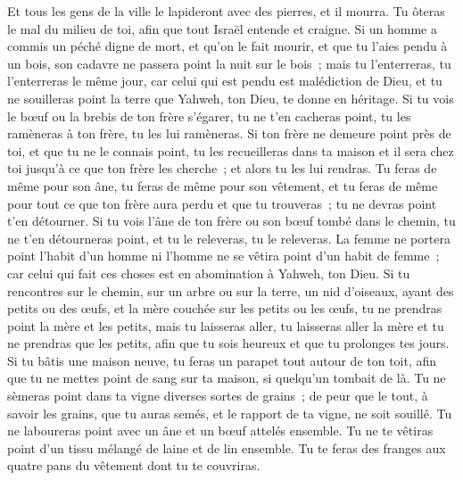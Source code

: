 \begin{multicols}{2}
Et tous les gens de la ville le lapideront avec des pierres, et il mourra. Tu ôteras le mal du milieu de toi, afin que tout Israël entende et craigne.
Si un homme a commis un péché digne de mort, et qu'on le fait mourir, et que tu l'aies pendu à un bois,
son cadavre ne passera point la nuit sur le bois~; mais tu l'enterreras, tu l'enterreras le même jour, car celui qui est pendu est malédiction de Dieu, et tu ne souilleras point la terre que Yahweh, ton Dieu, te donne en héritage.
\VerseOne{}Si tu vois le bœuf ou la brebis de ton frère s'égarer, tu ne t'en cacheras point, tu les ramèneras à ton frère, tu les lui ramèneras.
Si ton frère ne demeure point près de toi, et que tu ne le connais point, tu les recueilleras dans ta maison et il sera chez toi jusqu'à ce que ton frère les cherche~; et alors tu les lui rendras.
Tu feras de même pour son âne, tu feras de même pour son vêtement, et tu feras de même pour tout ce que ton frère aura perdu et que tu trouveras~; tu ne devras point t'en détourner.
Si tu vois l'âne de ton frère ou son bœuf tombé dans le chemin, tu ne t'en détourneras point, et tu le releveras, tu le releveras.
La femme ne portera point l'habit d'un homme ni l'homme ne se vêtira point d'un habit de femme~; car celui qui fait ces choses est en abomination à Yahweh, ton Dieu.
Si tu rencontres sur le chemin, sur un arbre ou sur la terre, un nid d'oiseaux, ayant des petits ou des œufs, et la mère couchée sur les petits ou les œufs, tu ne prendras point la mère et les petits,
mais tu laisseras aller, tu laisseras aller la mère et tu ne prendras que les petits, afin que tu sois heureux et que tu prolonges tes jours.
Si tu bâtis une maison neuve, tu feras un parapet tout autour de ton toit, afin que tu ne mettes point de sang sur ta maison, si quelqu'un tombait de là.
Tu ne sèmeras point dans ta vigne diverses sortes de grains~; de peur que le tout, à savoir les grains, que tu auras semés, et le rapport de ta vigne, ne soit souillé.
Tu ne laboureras point avec un âne et un bœuf attelés ensemble.
Tu ne te vêtiras point d'un tissu mélangé de laine et de lin ensemble.
Tu te feras des franges aux quatre pans du vêtement dont tu te couvriras.

\end{multicols}
